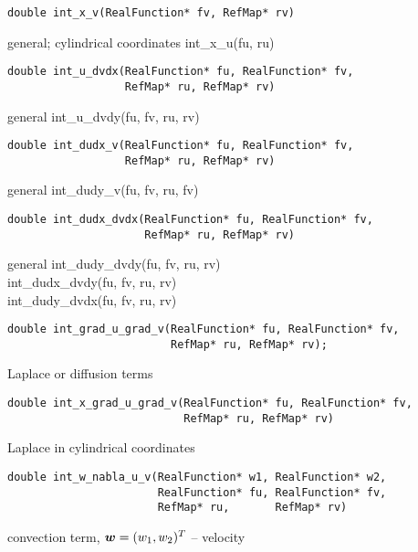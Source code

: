 \begin{lstlisting}
double int_x_v(RealFunction* fv, RefMap* rv)
\end{lstlisting}
      {general; cylindrical coordinates}
      {\var int\_x\_u(fu, ru)}
     


\begin{lstlisting}
double int_u_dvdx(RealFunction* fu, RealFunction* fv,
                  RefMap* ru, RefMap* rv)
\end{lstlisting}
      {general}
      {\var int\_u\_dvdy(fu, fv, ru, rv)}



\begin{lstlisting}
double int_dudx_v(RealFunction* fu, RealFunction* fv,
                  RefMap* ru, RefMap* rv)
\end{lstlisting}
      {general}
      {\var int\_dudy\_v(fu, fv, ru, fv)}



\begin{lstlisting}
double int_dudx_dvdx(RealFunction* fu, RealFunction* fv,
                     RefMap* ru, RefMap* rv)
\end{lstlisting}
      {general}
      {     \var int\_dudy\_dvdy(fu, fv, ru, rv) \\
       \>\> \var int\_dudx\_dvdy(fu, fv, ru, rv) \\
       \>\> \var int\_dudy\_dvdx(fu, fv, ru, rv) }


\begin{lstlisting}
double int_grad_u_grad_v(RealFunction* fu, RealFunction* fv,
                         RefMap* ru, RefMap* rv);
\end{lstlisting}
     {Laplace or diffusion terms}




\begin{lstlisting}
double int_x_grad_u_grad_v(RealFunction* fu, RealFunction* fv,
                           RefMap* ru, RefMap* rv)
\end{lstlisting}
     {Laplace in cylindrical coordinates}



\begin{lstlisting}
double int_w_nabla_u_v(RealFunction* w1, RealFunction* w2,
                       RealFunction* fu, RealFunction* fv,
                       RefMap* ru,       RefMap* rv)
\end{lstlisting}
     {convection term, $\mbox{\boldmath $w$} = (w_1, w_2)^T$ -- velocity}



